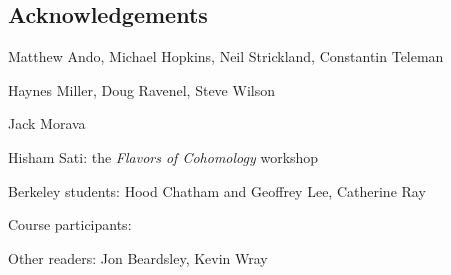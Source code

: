 
\subsection*{Acknowledgements}

Matthew Ando, Michael Hopkins, Neil Strickland, Constantin Teleman

Haynes Miller, Doug Ravenel, Steve Wilson

Jack Morava



Hisham Sati: the \textit{Flavors of Cohomology} workshop

Berkeley students: Hood Chatham and Geoffrey Lee, Catherine Ray

Course participants:

Other readers: Jon Beardsley, Kevin Wray
